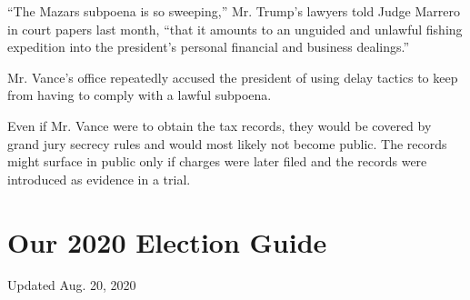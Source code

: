 ``The Mazars subpoena is so sweeping,'' Mr. Trump's lawyers told Judge
Marrero in court papers last month, ``that it amounts to an unguided and
unlawful fishing expedition into the president's personal financial and
business dealings.''

Mr. Vance's office repeatedly accused the president of using delay
tactics to keep from having to comply with a lawful subpoena.

Even if Mr. Vance were to obtain the tax records, they would be covered
by grand jury secrecy rules and would most likely not become public. The
records might surface in public only if charges were later filed and the
records were introduced as evidence in a trial.

\hypertarget{our-2020-election-guide}{%
\section{Our 2020 Election Guide}\label{our-2020-election-guide}}

Updated Aug. 20, 2020

